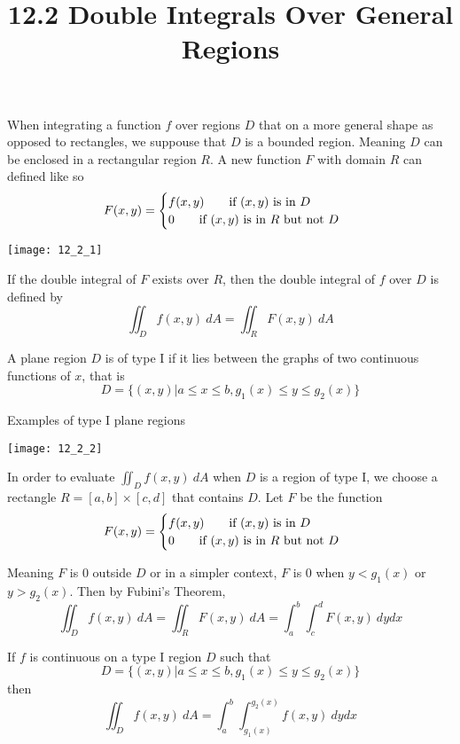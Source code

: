 \documentclass{article}
\title{12.2 Double Integrals Over General Regions}
\begin{document}
  \maketitle
  When integrating a function $ f $ over regions $ D $ that on a more general shape as opposed to rectangles, we suppouse that $ D $ is a bounded region. Meaning $ D $ can be enclosed in a rectangular region $ R $. A new function $ F $ with domain $ R $ can defined like so
  \[
    F(x,y) = 
    \begin{cases}
      f(x,y) \qquad \text{if $ (x,y) $ is in $ D $ }\\
      0 \qquad \text{if $ (x,y) $ is in $ R $ but not $ D $ }
    \end{cases}
  \]

  \begin{center}
    \texttt{[image: 12\_2\_1]}
  \end{center}

  If the double integral of $ F $ exists over $ R $, then the double integral of $ f $ over $ D $ is defined by
  \[
    \iint_D f(x,y)~dA = \iint_R F(x,y)~dA
  \]
 
  A plane region $ D $ is of type I if it lies between the graphs of two continuous functions of $ x $, that is
  \[
    D= \{ (x,y)| a \le x \le b, g_1(x) \le y \le g_2(x) \}
  \]

  Examples of type I plane regions
  \begin{center}
    \texttt{[image: 12\_2\_2]}
  \end{center}

  In order to evaluate $ \iint_D f(x,y)~dA $ when $ D $ is a region of type I, we choose a rectangle $ R = [a,b] \times [c,d] $ that contains $ D $. Let $ F $ be the function
  \[
    F(x,y) = 
    \begin{cases}
      f(x,y) \qquad \text{if $ (x,y) $ is in $ D $ }\\
      0 \qquad \text{if $ (x,y) $ is in $ R $ but not $ D $ }
    \end{cases}
  \]

  Meaning $ F $ is 0 outside $ D $ or in a simpler context, $ F $ is $ 0 $ when $ y < g_1(x) $ or $ y > g_2(x) $. Then by Fubini's Theorem,
  \[
    \iint_D f(x,y)~dA = \iint_R F(x,y)~dA = \int^{b}_{a} \int^{d}_{c} F(x,y) ~dydx 
  \]

  If $ f $ is continuous on a type I region $ D $ such that
  \[
    D = \{ (x,y) | a \le x \le b, g_1(x) \le y \le g_2(x) \}
  \]
  then
  \[
    \iint_D f(x,y)~dA = \int^{b}_{a} \int^{g_2(x)}_{g_1(x)} f(x,y) ~dydx 
  \]
\end{document}
